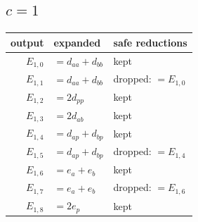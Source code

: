 \documentclass[10pt]{article}
\begin{document}
\subsection*{$c = 1$}
\begin{longtable}{r>{\raggedright\arraybackslash}p{}>{\raggedright\arraybackslash}p{}}
output & expanded & safe reductions \\ \hline
$E_{1,0}$ & $= d_{aa} + d_{bb}$ & kept \\
$E_{1,1}$ & $= d_{aa} + d_{bb}$ & dropped: $= E_{1,0}$ \\
$E_{1,2}$ & $= 2 d_{pp}$ & kept \\
$E_{1,3}$ & $= 2 d_{ab}$ & kept \\
$E_{1,4}$ & $= d_{ap} + d_{bp}$ & kept \\
$E_{1,5}$ & $= d_{ap} + d_{bp}$ & dropped: $= E_{1,4}$ \\
$E_{1,6}$ & $= e_{a} + e_{b}$ & kept \\
$E_{1,7}$ & $= e_{a} + e_{b}$ & dropped: $= E_{1,6}$ \\
$E_{1,8}$ & $= 2 e_{p}$ & kept \\
\end{longtable}
\end{document}
